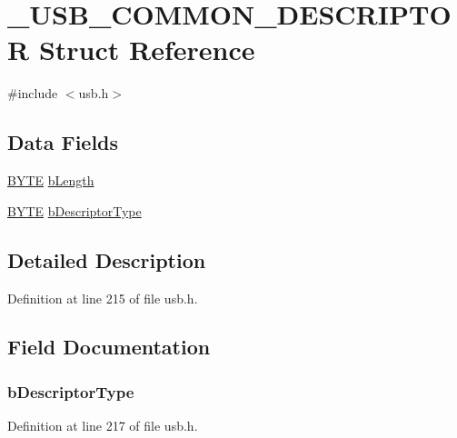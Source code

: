 \hypertarget{struct___u_s_b___c_o_m_m_o_n___d_e_s_c_r_i_p_t_o_r}{
\section{\_\-USB\_\-COMMON\_\-DESCRIPTOR Struct Reference}
\label{struct___u_s_b___c_o_m_m_o_n___d_e_s_c_r_i_p_t_o_r}
}


{\ttfamily \#include $<$usb.h$>$}

\subsection*{Data Fields}
\begin{DoxyCompactItemize}
\item 
\hyperlink{type_8h_a4ae1dab0fb4b072a66584546209e7d58}{BYTE} \hyperlink{struct___u_s_b___c_o_m_m_o_n___d_e_s_c_r_i_p_t_o_r_a8e443464272fdf3bd5148df0b7f5dcaf}{bLength}
\item 
\hyperlink{type_8h_a4ae1dab0fb4b072a66584546209e7d58}{BYTE} \hyperlink{struct___u_s_b___c_o_m_m_o_n___d_e_s_c_r_i_p_t_o_r_ac1d02ce6fe165032044fb81602a9b07c}{bDescriptorType}
\end{DoxyCompactItemize}


\subsection{Detailed Description}


Definition at line 215 of file usb.h.



\subsection{Field Documentation}
\hypertarget{struct___u_s_b___c_o_m_m_o_n___d_e_s_c_r_i_p_t_o_r_ac1d02ce6fe165032044fb81602a9b07c}{
\subsubsection[{bDescriptorType}]{ {\bf bDescriptorType}}}
\label{struct___u_s_b___c_o_m_m_o_n___d_e_s_c_r_i_p_t_o_r_ac1d02ce6fe165032044fb81602a9b07c}


Definition at line 217 of file usb.h.

